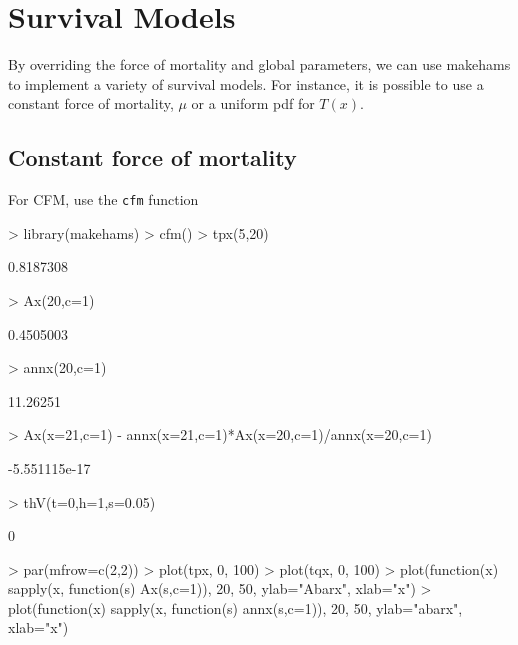 \documentclass[landscape]{article}
\begin{document}


\section{Survival Models}
By overriding the force of mortality and global parameters, we can use makehams to implement a variety of survival models. For instance, it is possible to use a constant force of mortality, $\mu$ or a uniform pdf for $T(x)$.

\subsection{Constant force of mortality}
For CFM, use the \texttt{cfm} function
\begin{Schunk}
\begin{Sinput}
> library(makehams)
> cfm()
> tpx(5,20)
\end{Sinput}
\begin{Soutput}
[1] 0.8187308
\end{Soutput}
\begin{Sinput}
> Ax(20,c=1)
\end{Sinput}
\begin{Soutput}
[1] 0.4505003
\end{Soutput}
\begin{Sinput}
> annx(20,c=1)
\end{Sinput}
\begin{Soutput}
[1] 11.26251
\end{Soutput}
\begin{Sinput}
> Ax(x=21,c=1) - annx(x=21,c=1)*Ax(x=20,c=1)/annx(x=20,c=1)
\end{Sinput}
\begin{Soutput}
[1] -5.551115e-17
\end{Soutput}
\begin{Sinput}
> thV(t=0,h=1,s=0.05)
\end{Sinput}
\begin{Soutput}
[1] 0
\end{Soutput}
\begin{Sinput}
> par(mfrow=c(2,2))
> plot(tpx, 0, 100)
> plot(tqx, 0, 100)
> plot(function(x) sapply(x, function(s) Ax(s,c=1)), 20, 50, ylab="Abarx", xlab="x")
> plot(function(x) sapply(x, function(s) annx(s,c=1)), 20, 50, ylab="abarx", xlab="x")
\end{Sinput}
\end{Schunk}
\end{document}
